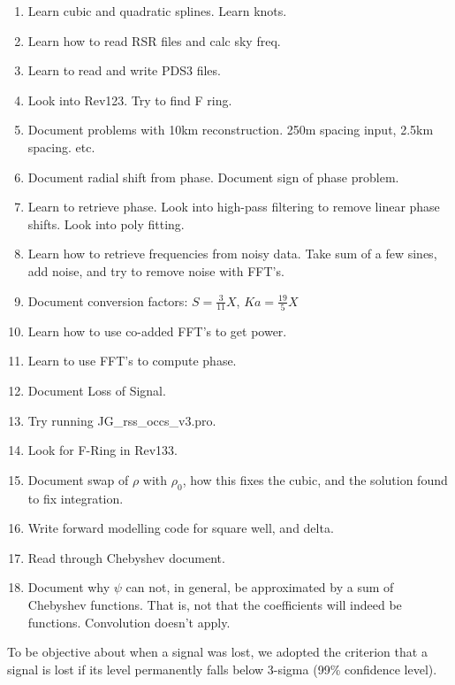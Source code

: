 \documentclass[crop=false,class=article,oneside]{standalone}
\begin{document}
\begin{enumerate}
            \item Learn cubic and quadratic splines. Learn knots.
            \item Learn how to read RSR files and calc sky freq.
            \item Learn to read and write PDS3 files.
            \item Look into Rev123. Try to find F ring.
            \item Document problems with 10km reconstruction.
                  250m spacing input, 2.5km spacing. etc.
            \item Document radial shift from phase. Document
                  sign of phase problem.
            \item Learn to retrieve phase. Look into high-pass filtering
                  to remove linear phase shifts. Look into poly fitting.
            \item Learn how to retrieve frequencies from noisy data.
                  Take sum of a few sines, add noise, and try to remove
                  noise with FFT's.
            \item Document conversion factors:
                  $S=\frac{3}{11}X$, $Ka=\frac{19}{5}X$
            \item Learn how to use co-added FFT's to get power.
            \item Learn to use FFT's to compute phase.
            \item Document Loss of Signal.
            \item Try running JG\_rss\_occs\_v3.pro.
            \item Look for F-Ring in Rev133.
            \item Document swap of $\rho$ with $\rho_{0}$, how this fixes
                  the cubic, and the solution found to fix integration.
            \item Write forward modelling code for square well, and delta.
            \item Read through Chebyshev document.
            \item Document why $\psi$ can not, in general, be
                  approximated by a sum of Chebyshev functions.
                  That is, not that the coefficients will indeed be
                  functions. Convolution doesn't apply.
        \end{enumerate}
To be objective about when a signal was lost, we adopted the criterion that a signal is lost if its level permanently falls below 3-sigma (99\% confidence level).
\end{document}
